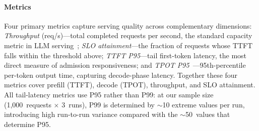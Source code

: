 \documentclass[conference]{IEEEtran}
\newcommand{\bidkv}{\textsc{BidKV}\xspace}
\newcommand{\qualdelta}{\ensuremath{\delta}}
\begin{document}
\paragraph{Metrics}
Four primary metrics capture serving quality across complementary dimensions:
\emph{Throughput} (req/s)---total completed requests per second, the standard
capacity metric in LLM serving~\cite{Kwon2023, Yu2022, Zheng2024sglang};
\emph{SLO attainment}---the fraction of requests whose
TTFT falls within the threshold above;
\emph{TTFT P95}---tail first-token latency, the most direct measure of
admission responsiveness;
and \emph{TPOT P95}~\cite{Agrawal2024sarathiserve}---95th-percentile per-token
output time, capturing decode-phase latency.
Together these four metrics cover prefill (TTFT), decode (TPOT), throughput, and
SLO attainment.
All tail-latency metrics use P95 rather than P99: at our sample size
(1{,}000~requests $\times$ 3~runs), P99 is determined by ${\sim}$10 extreme
values per run, introducing high run-to-run variance compared with the
${\sim}$50~values that determine P95.

\end{document}
